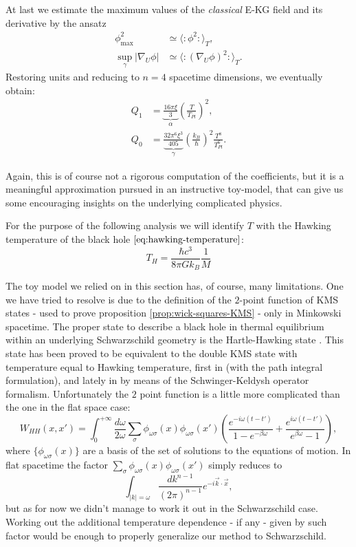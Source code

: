 At last we estimate the maximum values of the \emph{classical} E-KG field and its derivative by the ansatz 
\begin{align*}
	\phi_{\max}^2 &\simeq \langle \colon \phi^2 \colon\rangle_T,\\
	\sup_{\gamma}\vert \nabla_U\phi\vert &\simeq \langle \colon (\nabla_U\phi)^2 \colon\rangle_T.
\end{align*}
Restoring units and reducing to \(n = 4\) spacetime dimensions, we eventually obtain:
\begin{align}
	\label{eq:KMS_Q_1}
    Q_1 &= \underbrace{\frac{16\pi\xi}{3}}_{\alpha} \left(\frac{T}{T_{Pl}}\right)^2,\\
    Q_0 &= \underbrace{\frac{32\pi^6\xi^3}{405}}_{\gamma}\left(\frac{k_B}{\hbar}\right)^2 \frac{T^8}{T_{Pl}^6}.
\end{align}

Again, this is of course not a rigorous computation of the coefficients, but it is a meaningful approximation pursued in an instructive toy-model, that can give us some encouraging insights on the underlying complicated physics.

For the purpose of the following analysis we will identify \(T\) with the Hawking temperature of the black hole \(\eqref{eq:hawking-temperature}\):
\[
T_H = \frac{\hbar c^3}{8\pi Gk_B}\frac{1}{M}    
\]
    
\begin{remark}
	The toy model we relied on in this section has, of course, many limitations. One we have tried to resolve is due to the definition of the \(2\)-point function of KMS states - used to prove proposition \ref{prop:wick-squares-KMS} - only in Minkowski spacetime. The proper state to describe a black hole in thermal equilibrium within an underlying Schwarzschild geometry is the Hartle-Hawking state \cite[]{hartle1993path}. This state has been proved to be equivalent to the double KMS state with temperature equal to Hawking temperature, first in \cite[]{jacobson1994note, sanders2015construction} (with the path integral formulation), and lately in \cite[]{higuchi2022hartle} by means of the Schwinger-Keldysh operator formalism. Unfortunately the \(2\) point function is a little more complicated than the one in the flat space case:
	\[
	W_{HH}(x, x') = \int_{0}^{+\infty} \frac{d\omega}{2\omega} \sum_{\sigma}\phi_{\omega\sigma}(x)\phi_{\omega\sigma}(x')\left(\frac{e^{-i\omega(t - t')}}{1 - e^{-\beta \omega}} + \frac{e^{i\omega(t - t')}}{e^{\beta \omega} - 1}\right),
	\]
	where \(\{\phi_{\omega\sigma}(x)\}\) are a basis of the set of solutions to the equations of motion. In flat spacetime the factor \(\sum_{\sigma}\phi_{\omega\sigma}(x)\phi_{\omega\sigma}(x')\) simply reduces to 
	\[
		\int_{\vert k \vert = \omega}	\frac{dk^{n - 1}}{(2\pi)^{n - 1}} e^{-i\vec{k}\cdot \vec{x}},
	\]
	but as for now we didn't manage to work it out in the Schwarzschild case. Working out the additional temperature dependence - if any - given by such factor would be enough to properly generalize our method to Schwarzschild.
\end{remark}

